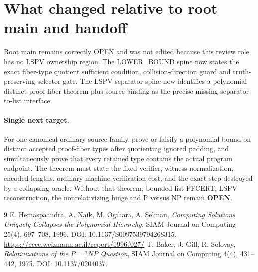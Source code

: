 \documentclass[11pt]{article}
\begin{document}
\section{What changed relative to root main and handoff}
Root main remains correctly OPEN and was not edited because this review role
has no LSPV ownership region.  The LOWER\_BOUND spine now states the exact
fiber-type quotient sufficient condition, collision-direction guard and
truth-preserving selector gate.  The LSPV separator spine now identifies a
polynomial distinct-proof-fiber theorem plus source binding as the precise
missing separator-to-list interface.

\paragraph{Single next target.}
For one canonical ordinary source family, prove or falsify a polynomial
bound on distinct accepted proof-fiber types after quotienting ignored
padding, and simultaneously prove that every retained type contains the
actual program endpoint.  The theorem must state the fixed verifier,
witness normalization, encoded lengths, ordinary-machine verification cost,
and the exact step destroyed by a collapsing oracle.  Without that theorem,
bounded-list PFCERT, LSPV reconstruction, the nonrelativizing hinge and
P versus NP remain \textbf{OPEN}.

\begin{thebibliography}{9}
 E. Hemaspaandra, A. Naik, M. Ogihara, A. Selman,
\emph{Computing Solutions Uniquely Collapses the Polynomial Hierarchy},
SIAM Journal on Computing 25(4), 697--708, 1996.
DOI: 10.1137/S0097539794268315.
\url{https://eccc.weizmann.ac.il/report/1996/027/}
 T. Baker, J. Gill, R. Solovay,
\emph{Relativizations of the $P=?NP$ Question}, SIAM Journal on Computing
4(4), 431--442, 1975. DOI: 10.1137/0204037.
\end{thebibliography}
\end{document}
